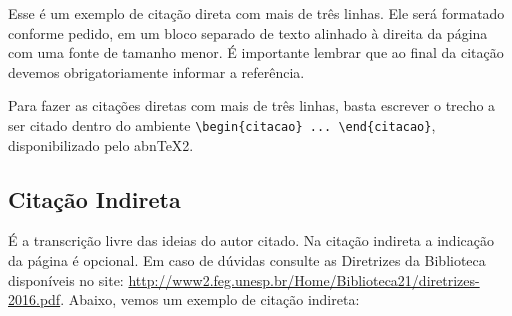 \documentclass[
  12pt,		%
  a4paper,	%
  openright,%
  oneside,	%
  chapter=TITLE,		%
  section=TITLE,		%
  english,	%
  french,	%
  spanish,	%
  brazil
]{abntex2}
\begin{document}
            
            
            
             \begin{citacao}
             Esse é um exemplo de citação direta com mais de três linhas. Ele será formatado conforme pedido, em um bloco separado de texto alinhado à direita da página com uma fonte de tamanho menor. É importante lembrar que ao final da citação devemos obrigatoriamente informar a referência. \cite[p.~3--4]{livro}
             \end{citacao}
             
             Para fazer as citações diretas com mais de três linhas, basta escrever o trecho a ser citado dentro do ambiente \verb|\begin{citacao} ... \end{citacao}|, disponibilizado pelo abn\TeX2.
             
             
        \subsection{Citação Indireta}
        
            É a transcrição livre das ideias do autor citado. Na citação indireta a indicação da página é opcional. Em caso de dúvidas consulte as Diretrizes da Biblioteca disponíveis no site: \url{http://www2.feg.unesp.br/Home/Biblioteca21/diretrizes-2016.pdf}. Abaixo, vemos um exemplo de citação indireta:
            
\end{document}
